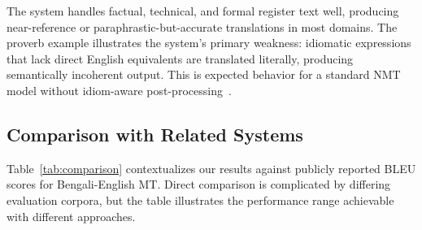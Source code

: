\documentclass[conference]{IEEEtran}
\begin{document}
The system handles factual, technical, and formal register text well, producing
near-reference or paraphrastic-but-accurate translations in most domains.
The proverb example illustrates the system's primary weakness: idiomatic expressions
that lack direct English equivalents are translated literally, producing semantically
incoherent output. This is expected behavior for a standard NMT model without
idiom-aware post-processing~\cite{fadaee2017data}.

\subsection{Comparison with Related Systems}

Table~\ref{tab:comparison} contextualizes our results against publicly reported
BLEU scores for Bengali-English MT.
Direct comparison is complicated by differing evaluation corpora, but the table
illustrates the performance range achievable with different approaches.
\end{document}
